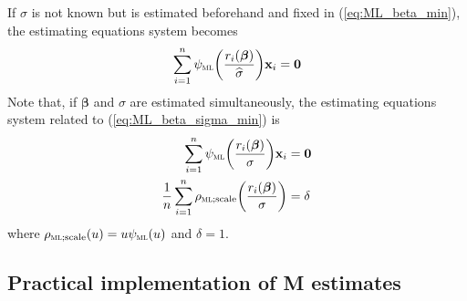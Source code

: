 If $\sigma$ is not known but is estimated beforehand and fixed in
(\ref{eq:ML_beta_min}), the estimating equations system becomes
\[
    \sum_{i=1}^{n} \psi_{\stsc{ML}}\left(\frac{r_i(\boldsymbol\beta)}{\sthat{\sigma}}\right) \stvec{x}_i = \stvec{0}
\]
Note that, if $\boldsymbol\beta$ and $\sigma$ are estimated simultaneously,
the estimating equations system related to (\ref{eq:ML_beta_sigma_min}) is
%
\begin{equation}\label{eq:ML_beta_sigma_equations}
    \begin{aligned}
        \sum\limits_{i=1}^{n} \psi_{\stsc{ML}}\left(\frac{r_i(\boldsymbol\beta)}{\sigma}\right) \stvec{x}_i 
        & = \stvec{0}
        \\
        \frac{1}{n} \sum\limits_{i=1}^{n} \rho_{\stsc{ML};\mathrm{scale}}\left(\frac{r_i(\boldsymbol\beta)}{\sigma}\right) 
        & = \delta
    \end{aligned}
\end{equation}
%
where $\rho_{\stsc{ML};\mathrm{scale}}(u) = u\psi_{\stsc{ML}}(u)$ and
$\delta=1$.

\subsection{Practical implementation of M estimates}
\label{subsec:practical_implementation_Mestimate}

